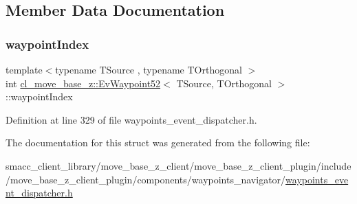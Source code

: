 \subsection{Member Data Documentation}
\mbox{\label{structcl__move__base__z_1_1EvWaypoint52_aeb62e7276a48fc62cec944bc4f8eeada}} 
\subsubsection{\texorpdfstring{waypoint\+Index}{waypointIndex}}
{\footnotesize\ttfamily template$<$typename T\+Source , typename T\+Orthogonal $>$ \\
int \hyperlink{structcl__move__base__z_1_1EvWaypoint52}{cl\+\_\+move\+\_\+base\+\_\+z\+::\+Ev\+Waypoint52}$<$ T\+Source, T\+Orthogonal $>$\+::waypoint\+Index}



Definition at line 329 of file waypoints\+\_\+event\+\_\+dispatcher.\+h.



The documentation for this struct was generated from the following file\+:\begin{DoxyCompactItemize}
\item 
smacc\+\_\+client\+\_\+library/move\+\_\+base\+\_\+z\+\_\+client/move\+\_\+base\+\_\+z\+\_\+client\+\_\+plugin/include/move\+\_\+base\+\_\+z\+\_\+client\+\_\+plugin/components/waypoints\+\_\+navigator/\hyperlink{waypoints__event__dispatcher_8h}{waypoints\+\_\+event\+\_\+dispatcher.\+h}\end{DoxyCompactItemize}
